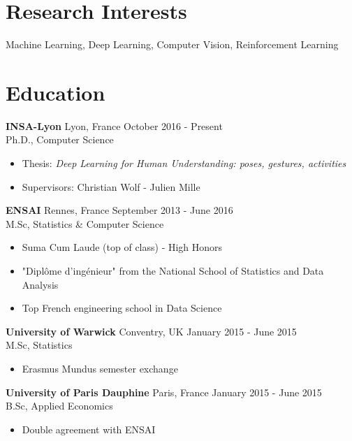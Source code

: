 \documentclass[10pt]{res} %
\begin{document}
\begin{resume}

 
\section{\large Research Interests}  
Machine Learning, Deep Learning, Computer Vision, Reinforcement Learning


\section{\large Education}
\textbf{INSA-Lyon} \hfill Lyon, France \hfill October 2016 - Present \\
Ph.D., Computer Science
\begin{itemize}
\item  Thesis: {\sl Deep Learning for Human Understanding: poses, gestures, activities}
\item  Supervisors: Christian Wolf - Julien Mille
\end{itemize}


\textbf{ENSAI} \hfill Rennes, France \hfill September 2013 - June 2016 \\
M.Sc, Statistics \& Computer Science
\begin{itemize}
\item Suma Cum Laude (top of class) - High Honors
\item "Diplôme d'ingénieur" from the National School of Statistics and Data Analysis
\item Top French engineering school in Data Science
\end{itemize}

\textbf{University of Warwick} \hfill Conventry, UK \hfill January 2015 - June 2015 \\
M.Sc, Statistics
\begin{itemize}
\item Erasmus Mundus semester exchange
\end{itemize}

\textbf{University of Paris Dauphine} \hfill Paris, France \hfill January 2015 - June 2015 \\
B.Sc, Applied Economics
\begin{itemize}
\item Double agreement with ENSAI
\end{itemize}


\end{resume}
\end{document}
